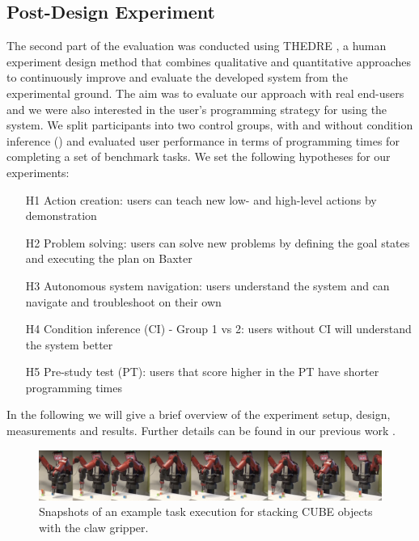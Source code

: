 \subsection{Post-Design Experiment}
\label{sec:quanteval}
The second part of the evaluation was conducted using THEDRE \cite{mandran2017thedre}, a human experiment design method that combines qualitative and quantitative approaches to continuously improve and evaluate the developed system from the experimental ground.
The aim was to evaluate our approach with real end-users and we were also interested in the user's programming strategy for using the system.
We split participants into two control groups, with and without condition inference () and evaluated user performance in terms of programming times for completing a set of benchmark tasks.
We set the following hypotheses for our experiments:
\begin{enumerate}
	\item[H1] Action creation: users can teach new low- and high-level actions by demonstration
	\item[H2] Problem solving: users can solve new problems by defining the goal states and executing the plan on Baxter
	\item[H3] Autonomous system navigation: users understand the system and can navigate and troubleshoot on their own
	\item[H4] Condition inference (CI) - Group 1 vs 2: users without CI will understand the system better
	\item[H5] Pre-study test (PT): users that score higher in the PT have shorter programming times
\end{enumerate}
In the following we will give a brief overview of the experiment setup, design, measurements and results.
Further details can be found in our previous work \cite{liang2019d}.

\begin{figure}
	\begin{centering}
		\includegraphics[width=\linewidth]{Fig12.png}
		\caption{Snapshots of an example task execution for stacking CUBE objects with the claw gripper.}
		\label{fig:filmstrip}
	\end{centering}
\end{figure}

